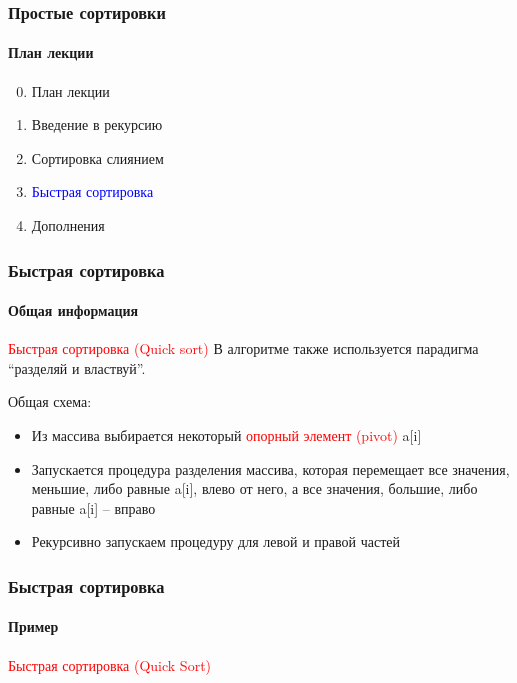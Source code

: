 \documentclass[aspectratio=169]{beamer}
\begin{document}
\begin{frame}
\frametitle{Простые сортировки}
\framesubtitle{План лекции}

\begin{enumerate}
  \setcounter{enumi}{-1}
  \item{План лекции}
  \item{Введение в рекурсию}
  \item{Сортировка слиянием}
  \item{\textcolor{blue}{Быстрая сортировка}}
  \item{Дополнения}
\end{enumerate}
\end{frame}

\begin{frame}
\frametitle{Быстрая сортировка}
\framesubtitle{Общая информация}
\justifying
\textcolor{red}{Быстрая сортировка (Quick sort)}\newline\newline
В алгоритме также используется парадигма “разделяй и властвуй”.\newline

Общая схема:

\begin{itemize}
\item{Из массива выбирается некоторый \textcolor{red}{опорный элемент (pivot)} a[i] }
\item{Запускается процедура разделения массива, которая перемещает все значения, меньшие, либо равные a[i], влево от него, а все значения, большие, либо равные a[i] – вправо}
\item{Рекурсивно запускаем процедуру для левой и правой частей}
\end{itemize}

\end{frame}

\begin{frame}
\frametitle{Быстрая сортировка}
\framesubtitle{Пример}
\justifying
\textcolor{red}{Быстрая сортировка (Quick Sort)}
\begin{figure}
    \captionsetup[subfigure]{labelformat=empty}
    \centering
\end{figure}

\end{frame}
\end{document}

